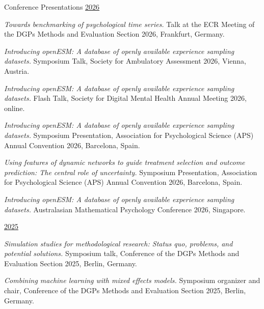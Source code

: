\documentclass{resume} %
\begin{document}
\begin{rSection}{Conference Presentations}
\underline{2026} 
\begin{etaremune}

\item \textit{Towards benchmarking of psychological time series.} Talk at the ECR Meeting of the DGPs Methods and Evaluation Section 2026, Frankfurt, Germany.

\item \textit{Introducing openESM: A database of openly available experience sampling datasets.} Symposium Talk, Society for Ambulatory Assessment 2026, Vienna, Austria. 

\item \textit{Introducing openESM: A database of openly available experience sampling datasets.} Flash Talk, Society for Digital Mental Health Annual Meeting 2026, online. 

\item \textit{Introducing openESM: A database of openly available experience sampling datasets.} Symposium Presentation, Association for Psychological Science (APS) Annual Convention 2026, Barcelona, Spain. 

\item \textit{Using features of dynamic networks to guide treatment selection and outcome prediction: The central role of uncertainty.} Symposium Presentation, Association for Psychological Science (APS) Annual Convention 2026, Barcelona, Spain. 

\item \textit{Introducing openESM: A database of openly available experience sampling datasets.} Australasian Mathematical Psychology Conference 2026, Singapore. 

\hspace{-0.75cm}\underline{2025}
\item \textit{Simulation studies for methodological research: Status quo, problems, and potential solutions.} Symposium talk, Conference of the DGPs Methods and Evaluation Section 2025, Berlin, Germany.

\item \textit{Combining machine learning with mixed effects models.} Symposium organizer and chair, Conference of the DGPs Methods and Evaluation Section 2025, Berlin, Germany.


\end{etaremune}
\end{rSection}
\end{document}
